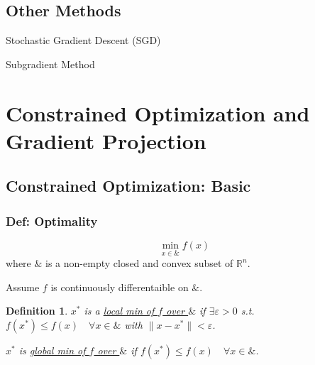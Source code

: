 \documentclass[11pt,a4paper]{article}
\newtheorem{definition}{Definition}
\begin{document}
\subsection{Other Methods}
Stochastic Gradient Descent (SGD)

Subgradient Method

\section{Constrained Optimization and Gradient Projection}
\subsection{Constrained Optimization: Basic}
\subsubsection{Def: Optimality}
$$\min_{x\in \&} f(x)$$
where $\&$ is a non-empty closed and convex subset of $\mathbb{R}^n$.

Assume $f$ is continuously differentaible on $\&$.

\begin{definition}
$x^*$ is a \underline{local min of $f$ over $\&$} if $\exists \varepsilon>0$ s.t. $f(x^*)\leq f(x)\quad \forall x\in \&$ with $\|x-x^*\|<\varepsilon$.

$x^*$ is \underline{global min of $f$ over $\&$} if $f(x^*)\leq f(x)\quad \forall x\in \&$.
\end{definition}
\end{document}
